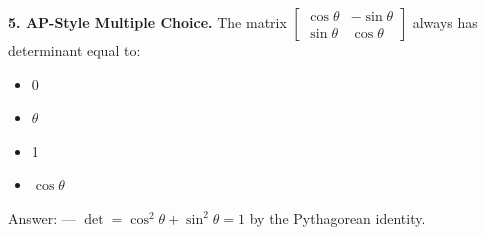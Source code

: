 \documentclass[10pt]{article}
\begin{document}
\vspace{0.10in}

\begin{notesbox}
\textbf{5. AP-Style Multiple Choice.}
The matrix $\begin{bmatrix}\cos\theta&-\sin\theta\\\sin\theta&\cos\theta\end{bmatrix}$
always has determinant equal to:

\vspace{0.08in}
\begin{itemize}[leftmargin=2em, itemsep=4pt]
  \item[(A)] 0
  \item[(B)] $\theta$
  \item[(C)] 1
  \item[(D)] $\cos\theta$
\end{itemize}

\vspace{0.08in}
Answer:  --- $\det = \cos^2\theta + \sin^2\theta = 1$ by the Pythagorean identity.
\end{notesbox}
\end{document}
